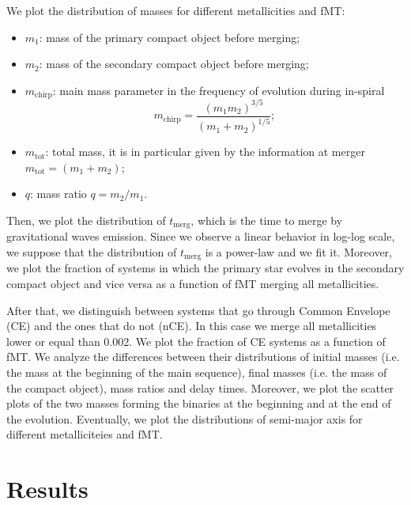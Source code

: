 \documentclass[prb,twocolumn,9pt]{revtex4-1}
\begin{document}
We plot the distribution of masses for different metallicities and fMT:
\begin{itemize}
    \item \(m_1\): mass of the primary compact object before merging;
    \item \(m_2\): mass of the secondary compact object before merging;
    \item \(m_{\text{chirp}} \): main mass parameter in the frequency of evolution during in-spiral
        \begin{equation*}
            m_{\text{chirp}} = \frac{(m_1 m_2)^{3/5}}{(m_1+m_2)^{1/5}};
        \end{equation*}
   \item \( m_{\text{tot}}\): total mass, it is in particular given by the information at merger \( m_{\text{tot}}  = (m_1+m_2) \);
   \item \(q\): mass ratio \(q  = m_2/m_1 \).
\end{itemize}
Then, we plot the distribution of \(t_{\text{merg}}\),  which is the time to merge by gravitational waves emission. Since we observe a linear behavior in log-log scale, we suppose that the distribution of \(t_{\text{merg}}\) is a power-law and we fit it. 
Moreover, we plot the fraction of systems in which the primary star evolves in the secondary compact object and vice versa as a function of fMT merging all metallicities.

After that, we distinguish between systems that go through Common Envelope (CE) and the ones that do not (nCE). In this case we merge all metallicities lower or equal than 0.002.
We plot the fraction of CE systems as a function of fMT.
We analyze the differences between their distributions of initial masses (i.e. the mass at the beginning of the main sequence), final masses (i.e. the mass of the compact object), mass ratios and delay times. 
Moreover, we plot the scatter plots of the two masses forming the binaries at the beginning and at the end of the evolution. 
Eventually, we plot the distributions of semi-major axis for different metalliciteies and fMT.



\section{Results}
\label{Results}
\end{document}
